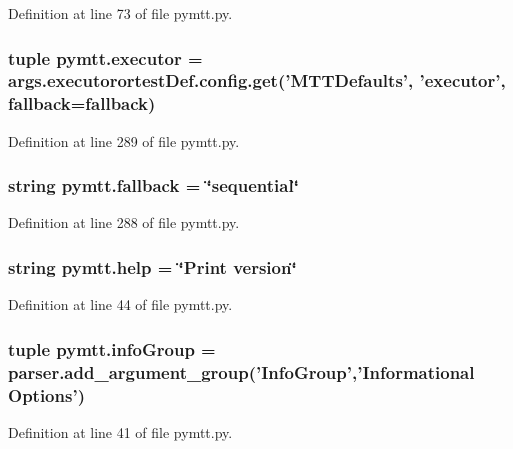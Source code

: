 Definition at line 73 of file pymtt.\-py.

\hypertarget{namespacepymtt_a283715e769294f7b1362c85498cdf2a3}{
\subsubsection[{executor}]{\setlength{\rightskip}{0pt plus 5cm}tuple pymtt.\-executor = args.\-executorortest\-Def.\-config.\-get('M\-T\-T\-Defaults', 'executor', {\bf fallback}={\bf fallback})}}\label{namespacepymtt_a283715e769294f7b1362c85498cdf2a3}


Definition at line 289 of file pymtt.\-py.

\hypertarget{namespacepymtt_a5d5ee597f85e5c40ec6a923a4398c291}{
\subsubsection[{fallback}]{\setlength{\rightskip}{0pt plus 5cm}string pymtt.\-fallback = \char`\"{}sequential\char`\"{}}}\label{namespacepymtt_a5d5ee597f85e5c40ec6a923a4398c291}


Definition at line 288 of file pymtt.\-py.

\hypertarget{namespacepymtt_a21e88c39af91deb569da20633d245b09}{
\subsubsection[{help}]{\setlength{\rightskip}{0pt plus 5cm}string pymtt.\-help = \char`\"{}Print version\char`\"{}}}\label{namespacepymtt_a21e88c39af91deb569da20633d245b09}


Definition at line 44 of file pymtt.\-py.

\hypertarget{namespacepymtt_a99ad2929ecc4e17f97670bed44f08c35}{
\subsubsection[{info\-Group}]{\setlength{\rightskip}{0pt plus 5cm}tuple pymtt.\-info\-Group = parser.\-add\-\_\-argument\-\_\-group('Info\-Group','Informational Options')}}\label{namespacepymtt_a99ad2929ecc4e17f97670bed44f08c35}


Definition at line 41 of file pymtt.\-py.

